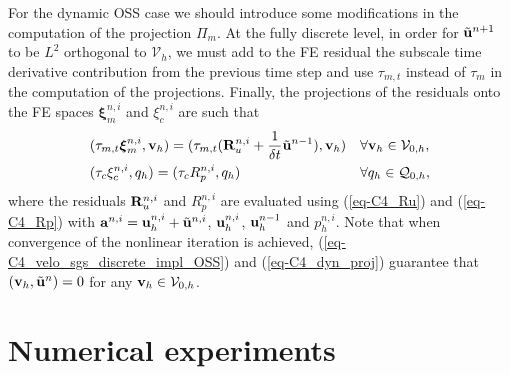 For the dynamic OSS case we should introduce some modifications in the computation of the projection $\Pi_m$. At the fully discrete level, in order for $\tilde{{\bf u}}^{n+1}$ to be $L^2$ orthogonal to $\mathcal{V}_{h}$, we must add to the FE residual the subscale time derivative contribution from the previous time step and use $\tau_{m,t}$ instead of $\tau_m$ in the computation of the projections. Finally, the projections of the residuals onto the FE spaces $\boldsymbol{\xi}_m^{n,i}$ and $\xi_c^{n,i}$ are such that
\begin{align}
\label{eq-C4_dyn_proj}
&(\tau_{m,t}\boldsymbol{\xi}_m^{n,i},{\bf v}_h)=(\tau_{m,t}({\bf R}_u^{n,i}+\frac{1}{\delta t} \tilde{\mathbf{u}}^{n-1}),{\bf v}_h)&&\forall{\bf v}_h\in\mathcal{V}_{0,h},\\
&(\tau_c\xi_c^{n,i},q_h)=(\tau_c R_p^{n,i},q_h)&&\forall q_h\in\mathcal{Q}_{0,h},
\end{align}
where the residuals ${\bf R}_u^{n,i}$ and $R_p^{n,i}$ are evaluated using (\ref{eq-C4_Ru}) and (\ref{eq-C4_Rp}) with ${\bf a}^{n,i}={\bf u}_h^{n,i}+\tilde{{\bf u}}^{n,i}$, ${\bf u}_h^{n,i}$, ${\bf u}_h^{n-1}$ and $p_h^{n,i}$. %
 Note that when convergence of the nonlinear iteration is achieved, (\ref{eq-C4_velo_sgs_discrete_impl_OSS}) and (\ref{eq-C4_dyn_proj}) guarantee that $({\bf v}_h,\tilde{\mathbf{u}}^{n}) = 0$ for any ${\bf v}_h\in\mathcal{V}_{0,h}$.

\section{Numerical experiments}
